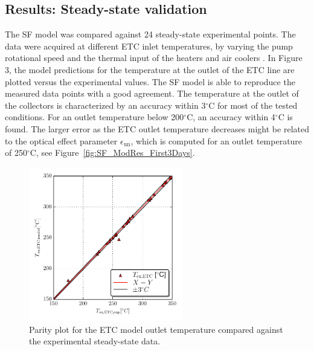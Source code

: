 \documentclass[final,3p,times,review]{elsarticle}
\begin{document}
%
\subsection{Results: Steady-state validation}
%
The SF model was compared against 24 steady-state experimental points. The data were acquired at different ETC inlet temperatures, by varying the pump rotational speed and the thermal input of the heaters and air coolers . In Figure 3, the model predictions for the temperature at the outlet of the ETC line are plotted versus the experimental values.
The SF model is able to reproduce the measured data points with a good agreement. The temperature at the outlet of the collectors is characterized  by an accuracy within 3$^{\circ}$C for most of the tested conditions. For an outlet temperature below 200$^{\circ}$C, an accuracy within 4$^{\circ}$C is found. The larger error as the ETC outlet temperature decreases might be related to the optical effect parameter $\epsilon_\mathrm{un}$, which is computed for an outlet temperature of 250$^{\circ}$C, see Figure~\ref{fig:SF_ModRes_First3Days}.
%
\begin{figure}[h!] 
	\centering
	\includegraphics[width=0.6\textwidth]{Figures/StSt_Validation.pdf}
	\caption{Parity plot for the ETC model outlet temperature compared against the experimental steady-state data.}
	\label{fig:SF_ModModel}
\end{figure}
%
%
\end{document}
